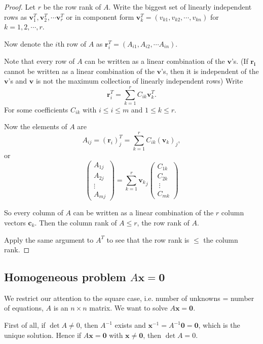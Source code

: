 \documentclass[a4paper]{article}
\theoremstyle{definition}
\newcommand{\mb}[1]{\mathbf{#1}}
\begin{document}
\begin{proof}
  Let $r$ be the row rank of $A$. Write the biggest set of linearly independent rows as $\mb{v}_1^T, \mb{v}_2^T, \cdots \mb{v}_r^T$ or in component form $\mb{v}_k^T = (v_{k1}, v_{k2}, \cdots, v_{kn})$ for $k = 1, 2, \cdots, r$.

Now denote the $i$th row of $A$ as $\mb{r}_i^T = (A_{i1}, A_{i2}, \cdots A_{in})$.

Note that every row of $A$ can be written as a linear combination of the $\mb{v}$'s. (If $\mb{r_i}$ cannot be written as a linear combination of the $\mb{v}$'s, then it is independent of the $\mb{v}$'s and $\mb{v}$ is not the maximum collection of linearly independent rows) Write
\[
\mb{r}_i^T = \sum_{k = 1}^r C_{ik}\mb{v}_{k}^T.
\]
For some coefficients $C_{ik}$ with $i \leq i\leq m$ and $1 \leq k \leq r$.

Now the elements of $A$ are
\[
A_{ij} = (\mb{r}_i)^T_j = \sum_{k = 1}^r C_{ik}(\mb{v}_k)_j,
\]
or
\[
\begin{pmatrix}
  A_{1j}\\
  A_{2j}\\
  \vdots\\
  A_{mj}
\end{pmatrix} = \sum_{k = 1}^r {\mb{v}_k}_j
\begin{pmatrix}
  C_{1k}\\
  C_{2k}\\\
  \vdots\\
  C_{mk}
\end{pmatrix}
\]

So every column of $A$ can be written as a linear combination of the $r$ column vectors $\mb{c}_k$. Then the column rank of $A \leq r$, the row rank of $A$.

Apply the same argument to $A^T$ to see that the row rank is $\leq$ the column rank.
\end{proof}

\subsection{Homogeneous problem \texorpdfstring{$A\mb{x} = \mb{0}$}{Ax = 0}}
We restrict our attention to the square case, i.e. number of unknowns = number of equations, $A$ is an $n\times n$ matrix. We want to solve $A\mb{x} = \mb{0}$.

First of all, if $\det A\not=0$, then $A^{-1}$ exists and $\mb{x}^{-1} = A^{-1}\mb{0} = \mb{0}$, which is the unique solution. Hence if $A\mb{x} = \mb{0}$ with $\mb{x} \not= \mb{0}$, then $\det A = 0$.
\end{document}
